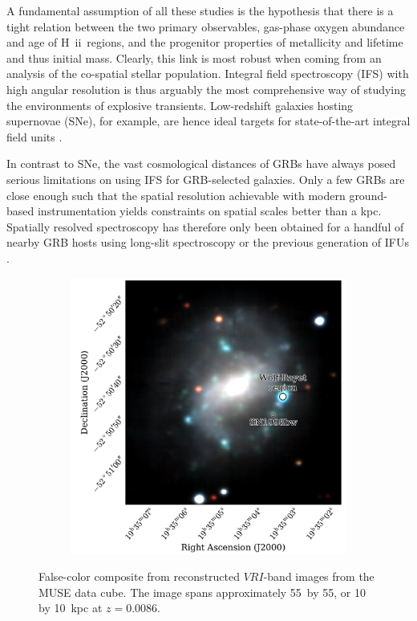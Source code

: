 \documentclass[traditabstract]{aa}
\newcommand{\hii}{\mbox{H~{\sc ii}}}
\begin{document}
A fundamental assumption of all these studies is the hypothesis that there is a tight relation between the two primary observables, gas-phase oxygen abundance and age of \hii~regions, and the progenitor properties of metallicity and lifetime and thus initial mass. Clearly, this link is most robust when coming from an analysis of the co-spatial stellar population. Integral field spectroscopy (IFS) with high angular resolution is thus arguably the most comprehensive way of studying the environments of explosive transients. Low-redshift galaxies hosting supernovae (SNe), for example, are hence ideal targets for state-of-the-art integral field units \citep[IFUs; e.g.,][]{2013AJ....146...30K, 2013AJ....146...31K, 2014A&A...572A..38G}.

In contrast to SNe, the vast cosmological distances of GRBs \citep[e.g.,][]{2009ApJS..185..526F, 2009Natur.461.1254T, 2012ApJ...758...46K} have always posed serious limitations on using IFS for GRB-selected galaxies. Only a few GRBs are close enough such that the spatial resolution achievable with modern ground-based instrumentation yields constraints on spatial scales better than a kpc. Spatially resolved spectroscopy has therefore only been obtained for a handful of nearby GRB hosts using long-slit spectroscopy \citep[e.g.,][]{2008ApJ...676.1151T, 2011ApJ...739...23L, 2015A&A...579A.126S} or the previous generation of IFUs \citep{2008A&A...490...45C, 2014MNRAS.441.2034T}.

\begin{figure}
\begin{subfigure}{.48\textwidth}
  \includegraphics[width=0.999\linewidth]{Figs/MUSE_SN1998bw_RGB.pdf}
\end{subfigure}
\caption{False-color composite from reconstructed $VRI$-band images from the MUSE data cube. The image spans approximately 55\arcsec~by 55\arcsec, or 10 by 10~kpc at $z=0.0086$.}
\label{fig:Host}
\end{figure}
\end{document}
